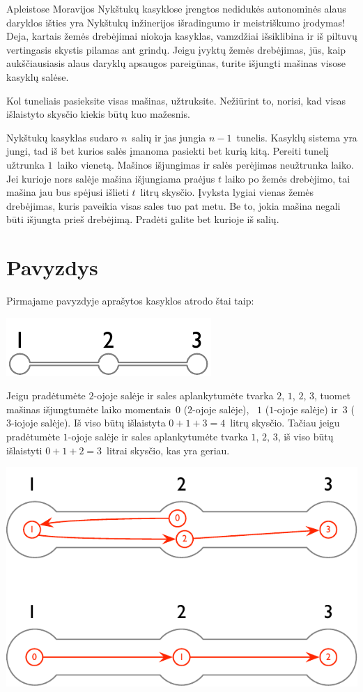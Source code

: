 
\noindent
Apleistose Moravijos Nykštukų kasyklose įrengtos nedidukės autonominės alaus daryklos
išties yra Nykštukų inžinerijos išradingumo ir meistriškumo įrodymas!
Deja, kartais žemės drebėjimai niokoja kasyklas, vamzdžiai išsiklibina ir iš piltuvų vertingasis skystis pilamas ant grindų.
Jeigu įvyktų žemės drebėjimas, jūs, kaip aukščiausiasis alaus daryklų apsaugos pareigūnas, turite išjungti mašinas visose kasyklų salėse.


Kol tuneliais pasieksite visas mašinas, užtruksite.
Nežiūrint to, norisi, kad visas išlaistyto skysčio kiekis būtų kuo mažesnis.

\medskip
Nykštukų kasyklas sudaro  $n$~salių ir jas jungia $n-1$~tunelis.
Kasyklų sistema yra jungi, tad iš bet kurios salės įmanoma pasiekti bet kurią kitą.
Pereiti tunelį užtrunka $1$~laiko vienetą.
Mašinos išjungimas ir salės perėjimas neužtrunka laiko.
Jei kurioje nors salėje mašina išjungiama praėjus $t$ laiko po žemės drebėjimo, tai mašina jau bus spėjusi išlieti
$t$~litrų skysčio.
Įvyksta lygiai vienas žemės drebėjimas, kuris paveikia visas sales tuo pat metu. 
Be to, jokia mašina negali būti išjungta prieš drebėjimą. 
Pradėti galite bet kurioje iš salių.

\section*{Pavyzdys}

Pirmajame pavyzdyje aprašytos kasyklos atrodo štai taip:

\includegraphics[width=.2\textwidth]{img/sample-1.pdf}

Jeigu pradėtumėte $2$-ojoje salėje ir sales aplankytumėte tvarka $2$, $1$, $2$, $3$, 
tuomet mašinas išjungtumėte laiko momentais~$0$ ($2$-ojoje salėje), ~$1$ ($1$-ojoje salėje) ir~$3$ ($3$-iojoje salėje).
Iš viso būtų išlaistyta $0+1+3=4$~litrų skysčio.
Tačiau jeigu pradėtumėte $1$-ojoje salėje ir sales aplankytumėte tvarka $1$, $2$, $3$, 
iš viso būtų išlaistyti $0+1+2=3$~litrai skysčio, kas yra geriau.

\includegraphics[width=.4\textwidth]{img/sample-1-ans.pdf}

